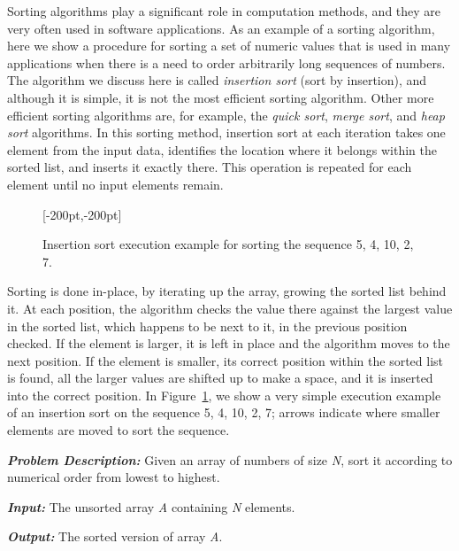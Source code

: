 {{{Sorting algorithms play a significant role in computation methods, and they are very often used in software applications. As an example of a sorting algorithm, here we show a procedure for sorting a set of numeric values that is used in many applications when there is a need to order arbitrarily long sequences of numbers. The algorithm we discuss here is called \textit{insertion sort} (sort by insertion), and although it is simple, it is not the most efficient sorting algorithm. Other more efficient sorting algorithms are, for example, the \textit{quick sort}, \textit{merge sort}, and \textit{heap sort} algorithms. In this sorting method, insertion sort at each iteration takes one element from the input data, identifies the location where it belongs within the sorted list, and inserts it exactly there. This operation is repeated for each element until no input elements remain.

\begin{figure}[b!]
[-200pt,-200pt]
\caption{\label{fig:1.3}Insertion sort execution example for sorting the sequence 5, 4, 10, 2, 7.}\vspace*{-10pt}
\end{figure}



Sorting is done in-place, by iterating up the array, growing the sorted list behind it. At each position, the algorithm checks the value there against the largest value in the sorted list, which happens to be next to it, in the previous position checked. If the element is larger, it is left in place and the algorithm moves to the next position. If the element is smaller, its correct position within the sorted list is found, all the larger values are shifted up to make a space, and it is inserted into the correct position. In Figure~\ref{fig:1.3}, we show a very simple execution example of an insertion sort on the sequence 5, 4, 10, 2, 7; arrows indicate where smaller elements are moved to sort the sequence.


\begin{algorithm}[h!]
\textbf{\textit{Problem Description: }}Given an array of numbers of size \textit{N}, sort it according to numerical order from lowest to highest.

\textbf{\textit{Input:}} The unsorted array \textit{A} containing \textit{N} elements.

\textbf{\textit{Output:}} The sorted version of array \textit{A}.


\end{algorithm}}}}
